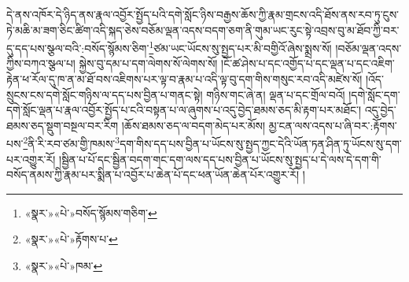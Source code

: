 དེ་ནས་འཁོར་དེ་ཉིད་ནས་རྣལ་འབྱོར་སྤྱོད་པའི་དགེ་སློང་ཉིས་བརྒྱས་ཆོས་ཀྱི་རྣམ་གྲངས་འདི་ཐོས་ནས་རབ་ཏུ་ངུས་ཏེ་མཆི་མ་ཟག་ཅིང་ཚིག་འདི་སྐད་ཅེས་བཅོམ་ལྡན་འདས་བདག་ཅག་ནི་གུམ་ཡང་རུང་སྟེ་འབྲས་བུ་མ་ཐོབ་ཀྱི་བར་དུ་དད་པས་སྩལ་བའི་:བསོད་སྙོམས་ཅིག་\footnote{«སྣར་»«པེ་»བསོད་སྙོམས་གཅིག་}ཙམ་ཡང་ཡོངས་སུ་སྤྱད་པར་མི་བགྱིའོ་ཞེས་སྨྲས་སོ། །བཅོམ་ལྡན་འདས་ཀྱིས་བཀའ་སྩལ་པ། སྐྱེས་བུ་དམ་པ་དག་ལེགས་སོ་ལེགས་སོ། །ངོ་ཚ་ཤེས་པ་དང་འགྱོད་པ་དང་ལྡན་པ་དང་འཇིག་རྟེན་ཕ་རོལ་དུ་ཁ་ན་མ་ཐོ་བས་འཇིགས་པར་ལྟ་བ་རྣམ་པ་འདི་ལྟ་བུ་དག་གིས་གསུང་རབ་འདི་མཛེས་སོ། །འོད་སྲུངས་ངས་དགེ་སློང་གཉིས་ལ་དད་པས་བྱིན་པ་གནང་སྟེ། གཉིས་གང་ཞེ་ན། ལྡན་པ་དང་གྲོལ་བའོ། །དགེ་སློང་དག་དགེ་སློང་ལྡན་པ་རྣལ་འབྱོར་སྤྱོད་པ་ངའི་བསྟན་པ་ལ་ཞུགས་པ་འདུ་བྱེད་ཐམས་ཅད་མི་རྟག་པར་མཐོང་། འདུ་བྱེད་ཐམས་ཅད་སྡུག་བསྔལ་བར་རིག །ཆོས་ཐམས་ཅད་ལ་བདག་མེད་པར་མོས། མྱ་ངན་ལས་འདས་པ་ཞི་བར་:རྟོགས་པས་\footnote{«སྣར་»«པེ་»རྟོགས་པ་}ནི་རི་རབ་ཙམ་གྱི་ཁམས་\footnote{«སྣར་»«པེ་»ཁམ་}དག་གིས་དད་པས་བྱིན་པ་ཡོངས་སུ་སྤྱད་ཀྱང་དེའི་ཡོན་ཏན་ཤིན་ཏུ་ཡོངས་སུ་དག་པར་འགྱུར་རོ། །སྦྱིན་པ་པོ་དང་སྦྱིན་བདག་གང་དག་ལས་དད་པས་བྱིན་པ་ཡོངས་སུ་སྤྱད་པ་དེ་ལས་དེ་དག་གི་བསོད་ནམས་ཀྱི་རྣམ་པར་སྨིན་པ་འབྱོར་པ་ཆེན་པོ་དང་ཕན་ཡོན་ཆེན་པོར་འགྱུར་རོ། །
